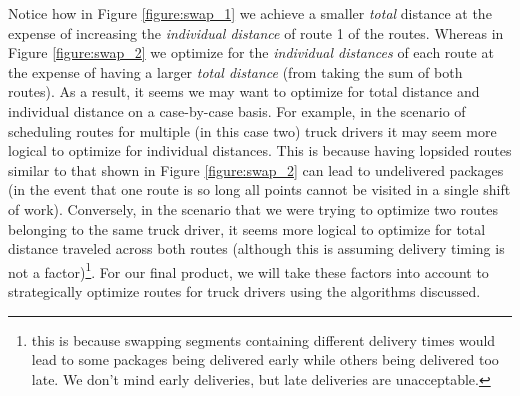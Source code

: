 \documentclass[letterpaper]{article}
\begin{document}
\begin{figure}[h]
\begin{minipage}{0.45\linewidth}
        \end{minipage}
    \end{figure}

    \newpage
    Notice how in Figure \ref*{figure:swap_1} we achieve a smaller \emph{total} distance at the expense of increasing the \emph{individual distance} of route 1 of the routes. Whereas in Figure \ref*{figure:swap_2} we optimize for the \emph{individual distances} of each route at the expense of having a larger \emph{total distance} (from taking the sum of both routes). As a result, it seems we may want to optimize for total distance and individual distance on a case-by-case basis. For example, in the scenario of scheduling routes for multiple (in this case two) truck drivers it may seem more logical to optimize for individual distances. This is because having lopsided routes similar to that shown in Figure \ref*{figure:swap_2} can lead to undelivered packages (in the event that one route is so long all points cannot be visited in a single shift of work). Conversely, in the scenario that we were trying to optimize two routes belonging to the same truck driver, it seems more logical to optimize for total distance traveled across both routes (although this is assuming delivery timing is not a factor)\footnote{this is because swapping segments containing different delivery times would lead to some packages being delivered early while others being delivered too late. We don't mind early deliveries, but late deliveries are unacceptable.}. For our final product, we will take these factors into account to strategically optimize routes for truck drivers using the algorithms discussed.
    
\end{document}
